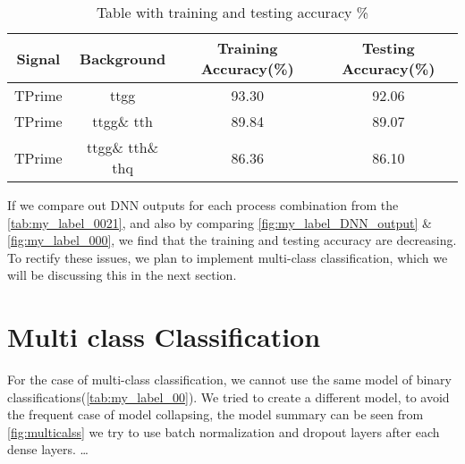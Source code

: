 
\begin{table}[H]
    \centering
     \caption{Table with training and testing accuracy \%}
    \begin{tabular}{|c|c|c|c|}\hline
        Signal & Background & Training Accuracy(\%) & Testing Accuracy(\%) \\\hline
        TPrime & ttgg & 93.30 & 92.06  \\
        TPrime & ttgg\& tth & 89.84 & 89.07\\
        TPrime & ttgg\& tth\& thq & 86.36 & 86.10 \\ \hline
    \end{tabular}
    \label{tab:my_label_0021}
\end{table}

If we compare out DNN outputs for each process combination from the \autoref{tab:my_label_0021}, and also by comparing \autoref{fig:my_label_DNN_output} \& \autoref{fig:my_label_000}, we find that the training and testing accuracy are decreasing. To rectify these issues, we plan to implement multi-class classification, which we will be discussing this in the next section.
\section{Multi class Classification}
For the case of multi-class classification, we cannot use the same model of binary classifications(\autoref{tab:my_label_00}). We tried to create a different model, to avoid the frequent case of model collapsing, the model summary can be seen from \autoref{fig:multicalss} we try to use batch normalization and dropout layers after each dense layers. \dots 


